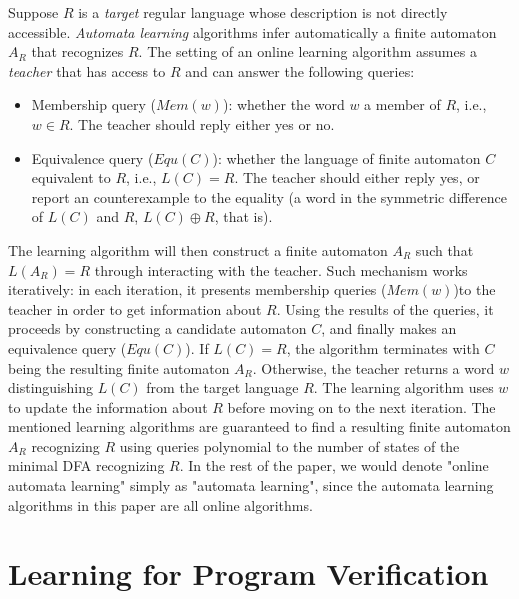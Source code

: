 Suppose $R$ is a \emph{target} regular language whose description is not directly accessible. \emph{Automata learning} algorithms \cite{Angluin87, BolligHKL09, RivestS93, KearnsV94} infer automatically a finite automaton $A_R$ that recognizes $R$. The setting of an online learning algorithm assumes a \emph{teacher} that has access to $R$ and can answer the following queries:
\begin{itemize}
	\item Membership query ($Mem(w)$): whether the word $w$ a member of $R$, i.e., $w \in R$. The teacher should reply either yes or no. 
	\item Equivalence query ($Equ(C)$): whether the language of finite automaton $C$ equivalent to $R$, i.e., $L(C) = R$. The teacher should either reply yes, or report an counterexample to the equality (a word in the symmetric difference of $L(C)$ and $R$, $L(C) \oplus R$, that is).	
\end{itemize}
The learning algorithm will then construct a finite automaton $A_R$ such that $L(A_R) = R$ through interacting with the teacher. Such mechanism works iteratively: in each iteration, it presents membership queries ($Mem(w)$)to the teacher in order to get information about $R$. Using the results of the queries, it proceeds by constructing a candidate automaton $C$, and finally makes an equivalence query ($Equ(C)$). If $L(C) = R$, the algorithm terminates with $C$ being the resulting finite automaton $A_R$. Otherwise, the teacher returns a word $w$ distinguishing $L(C)$ from the target language $R$. The learning algorithm uses $w$ to update the information about $R$ before moving on to the next iteration. The mentioned learning algorithms are guaranteed to find a resulting finite automaton $A_R$ recognizing $R$ using queries polynomial to the number of states of the minimal DFA recognizing $R$. In the rest of the paper, we would denote "online automata learning" simply as "automata learning", since the automata learning algorithms in this paper are all online algorithms. 

\section{Learning for Program Verification}\label{sec:learning_program_verify}
